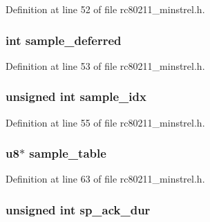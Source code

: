 Definition at line 52 of file rc80211\-\_\-minstrel.\-h.

\hypertarget{structminstrel__sta__info_a73679483ce1d15dfa5cbd2705109f48f}{
\subsubsection[{sample\-\_\-deferred}]{\setlength{\rightskip}{0pt plus 5cm}int sample\-\_\-deferred}}\label{structminstrel__sta__info_a73679483ce1d15dfa5cbd2705109f48f}


Definition at line 53 of file rc80211\-\_\-minstrel.\-h.

\hypertarget{structminstrel__sta__info_a6a478735f9902c260260559529323f93}{
\subsubsection[{sample\-\_\-idx}]{\setlength{\rightskip}{0pt plus 5cm}unsigned int sample\-\_\-idx}}\label{structminstrel__sta__info_a6a478735f9902c260260559529323f93}


Definition at line 55 of file rc80211\-\_\-minstrel.\-h.

\hypertarget{structminstrel__sta__info_aec1be199b41d56f11787b0eb67f6163c}{
\subsubsection[{sample\-\_\-table}]{\setlength{\rightskip}{0pt plus 5cm}u8$\ast$ sample\-\_\-table}}\label{structminstrel__sta__info_aec1be199b41d56f11787b0eb67f6163c}


Definition at line 63 of file rc80211\-\_\-minstrel.\-h.

\hypertarget{structminstrel__sta__info_a1023b3884bcb7252fd484344ce4d5201}{
\subsubsection[{sp\-\_\-ack\-\_\-dur}]{\setlength{\rightskip}{0pt plus 5cm}unsigned int sp\-\_\-ack\-\_\-dur}}\label{structminstrel__sta__info_a1023b3884bcb7252fd484344ce4d5201}


